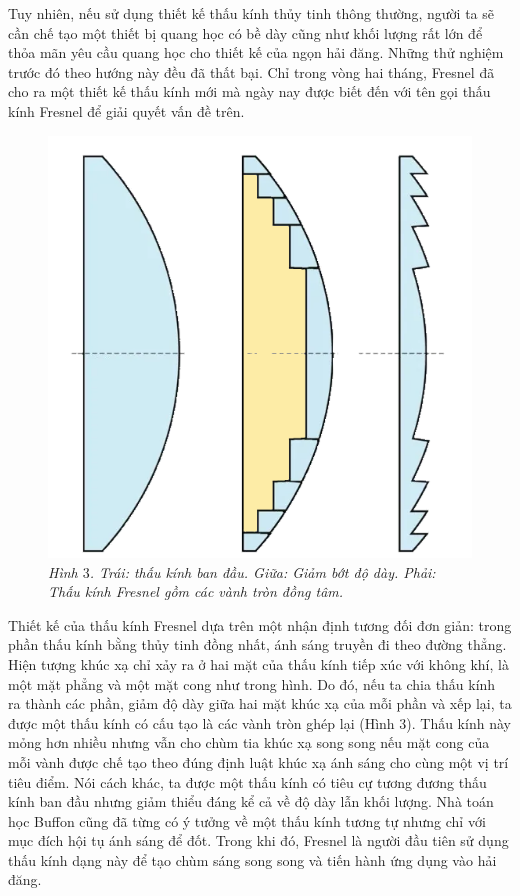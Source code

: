\begin{multicols}{2}
	\vskip 0.1cm
	Tuy nhiên, nếu sử dụng thiết kế thấu kính thủy tinh thông thường, người ta sẽ cần chế tạo một thiết bị quang học có bề dày cũng như khối lượng rất lớn để thỏa mãn yêu cầu quang học cho thiết kế của ngọn hải đăng. Những thử nghiệm trước đó theo hướng này đều đã thất bại. Chỉ trong vòng hai tháng, Fresnel đã cho ra một thiết kế thấu kính mới mà ngày nay được biết đến với tên gọi thấu kính Fresnel để giải quyết vấn đề trên.
	\begin{figure}[H]
		\vspace*{-5pt}
		\centering
		\captionsetup{labelformat= empty, justification=centering}
		\includegraphics[width= 0.75\linewidth]{4}
		\caption{\small\textit{\color{timhieukhoahoc}Hình $3$. Trái: thấu kính ban đầu. Giữa: Giảm bớt độ dày. Phải: Thấu kính Fresnel gồm các vành tròn đồng tâm.}}
		\vspace*{-10pt}
	\end{figure}
	Thiết kế của thấu kính Fresnel dựa trên một nhận định tương đối đơn giản: trong phần thấu kính  bằng thủy tinh đồng nhất, ánh sáng truyền đi theo đường thẳng. Hiện tượng khúc xạ chỉ xảy ra ở hai mặt của thấu kính tiếp xúc với không khí, là một mặt phẳng và một mặt cong như trong hình. Do đó, nếu ta chia thấu kính ra thành các phần, giảm độ dày giữa hai mặt khúc xạ của mỗi phần và xếp lại, ta được một thấu kính có cấu tạo là các vành tròn ghép lại (Hình $3$). Thấu kính này mỏng hơn nhiều nhưng vẫn cho chùm tia khúc xạ song song nếu mặt cong của mỗi vành được chế tạo theo đúng định luật khúc xạ ánh sáng cho cùng một vị trí tiêu điểm. Nói cách khác, ta được một thấu kính có tiêu cự tương đương thấu kính ban đầu nhưng giảm thiểu đáng kể cả về độ dày lẫn khối lượng. Nhà toán học Buffon cũng đã từng có ý tưởng về một thấu kính tương tự nhưng chỉ với mục đích hội tụ ánh sáng để đốt. Trong khi đó, Fresnel là người đầu tiên sử dụng thấu kính dạng này để tạo chùm sáng song song và tiến hành ứng dụng vào hải đăng. 

\end{multicols}
